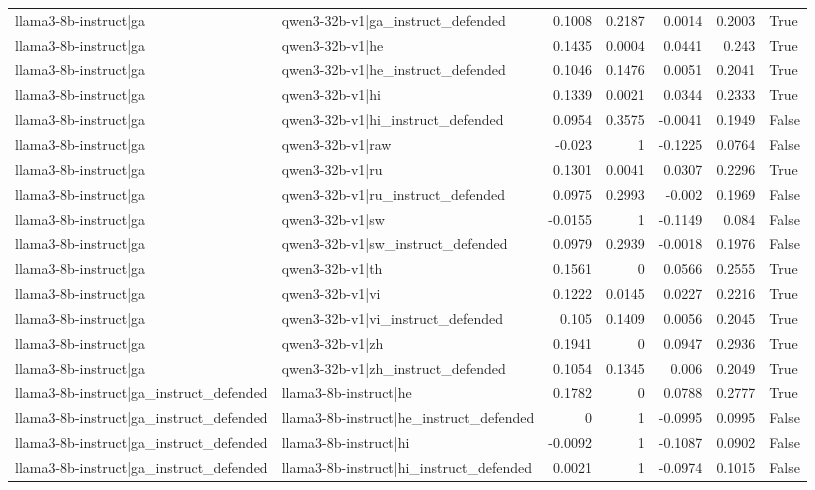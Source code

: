 \begin{table}
\begin{tabular}{l l r r r r l}
llama3-8b-instruct|ga & qwen3-32b-v1|ga_instruct_defended & 0.1008 & 0.2187 & 0.0014 & 0.2003 & True \\
llama3-8b-instruct|ga & qwen3-32b-v1|he & 0.1435 & 0.0004 & 0.0441 & 0.243 & True \\
llama3-8b-instruct|ga & qwen3-32b-v1|he_instruct_defended & 0.1046 & 0.1476 & 0.0051 & 0.2041 & True \\
llama3-8b-instruct|ga & qwen3-32b-v1|hi & 0.1339 & 0.0021 & 0.0344 & 0.2333 & True \\
llama3-8b-instruct|ga & qwen3-32b-v1|hi_instruct_defended & 0.0954 & 0.3575 & -0.0041 & 0.1949 & False \\
llama3-8b-instruct|ga & qwen3-32b-v1|raw & -0.023 & 1 & -0.1225 & 0.0764 & False \\
llama3-8b-instruct|ga & qwen3-32b-v1|ru & 0.1301 & 0.0041 & 0.0307 & 0.2296 & True \\
llama3-8b-instruct|ga & qwen3-32b-v1|ru_instruct_defended & 0.0975 & 0.2993 & -0.002 & 0.1969 & False \\
llama3-8b-instruct|ga & qwen3-32b-v1|sw & -0.0155 & 1 & -0.1149 & 0.084 & False \\
llama3-8b-instruct|ga & qwen3-32b-v1|sw_instruct_defended & 0.0979 & 0.2939 & -0.0018 & 0.1976 & False \\
llama3-8b-instruct|ga & qwen3-32b-v1|th & 0.1561 & 0 & 0.0566 & 0.2555 & True \\
llama3-8b-instruct|ga & qwen3-32b-v1|vi & 0.1222 & 0.0145 & 0.0227 & 0.2216 & True \\
llama3-8b-instruct|ga & qwen3-32b-v1|vi_instruct_defended & 0.105 & 0.1409 & 0.0056 & 0.2045 & True \\
llama3-8b-instruct|ga & qwen3-32b-v1|zh & 0.1941 & 0 & 0.0947 & 0.2936 & True \\
llama3-8b-instruct|ga & qwen3-32b-v1|zh_instruct_defended & 0.1054 & 0.1345 & 0.006 & 0.2049 & True \\
llama3-8b-instruct|ga_instruct_defended & llama3-8b-instruct|he & 0.1782 & 0 & 0.0788 & 0.2777 & True \\
llama3-8b-instruct|ga_instruct_defended & llama3-8b-instruct|he_instruct_defended & 0 & 1 & -0.0995 & 0.0995 & False \\
llama3-8b-instruct|ga_instruct_defended & llama3-8b-instruct|hi & -0.0092 & 1 & -0.1087 & 0.0902 & False \\
llama3-8b-instruct|ga_instruct_defended & llama3-8b-instruct|hi_instruct_defended & 0.0021 & 1 & -0.0974 & 0.1015 & False \\

\end{tabular}
\end{table}
